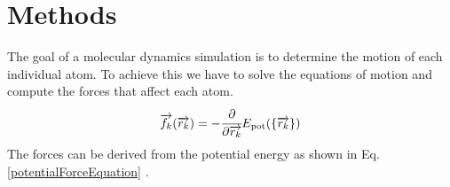 \chapter{Methods}
\begin{comment}
	0. Verlet Step
	1. Describe the Lenard Jones Potential
	2. Describe the Berendsen Thermostat
	3. Describe the Gupta 
	
\end{comment}
\begin{comment}
	Atoms are discreticed into the Postitions, Velocities and Forces 
	Second propagate the atom in the discriticed realm given constant Forces
		-> Velocity-Verlet Integration
	
	Compute Forces somehow
	-> Potentials
	LJ Potential 
	Gupta Potential
	
	Thermodynamic Effects
	Berendsen Thermostat
		->Gentle Way of resealing the Velocities
		
\end{comment}
\begin{comment}
goals of a md simulation
- determine the motion of each atom
	-> solve equation of motion 
	-> compute forces
	-> From the dirivation of the potential energy we can get the forces

- disciticed in time

\end{comment}
The goal of a molecular dynamics simulation is to determine the motion of each individual atom. To achieve this we have to solve the equations of motion and compute the forces that affect each atom.
\begin{equation}
	\label{potentialForceEquation}
	\overrightarrow{f_{k}}(\overrightarrow{r_{k}}) = -\cfrac{\displaystyle\partial}{\displaystyle \partial \overrightarrow{r_{k}}} E_{\mathrm{pot}}(\{\overrightarrow{r_{k}}\}) 
\end{equation}
The forces can be derived from the potential energy as shown in Eq.  \ref{potentialForceEquation} \cite[][]{molDymCourse}. 


